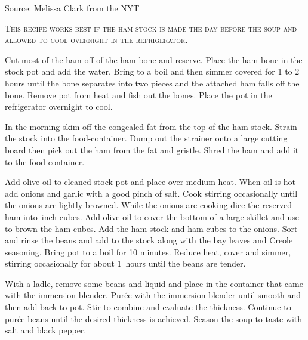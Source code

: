 \documentclass[letterpaper]{recipePMG}
\newcommand{\quarter}{\nicefrac{1}{4} \,}
\newcommand{\half}{\nicefrac{1}{2} \,}
\begin{document}
Source: Melissa Clark from the NYT


\newpage
{}
\label{ButterBeanAndHamSoup}



\textsc{This recipe works best if the ham stock is made the day before the soup and allowed to cool overnight in the refrigerator.}

Cut most of the ham off of the ham bone and reserve.  Place the ham bone in the stock pot and add the water.  Bring to a boil and then simmer covered for 1 to 2 hours until the bone separates into two pieces and the attached ham falls off the bone. Remove pot from heat and fish out the bones.  Place the pot in the refrigerator overnight to cool.

In the morning skim off the congealed fat from the top of the ham stock. Strain the stock into  the food-container. Dump out the strainer onto a large cutting board then pick out the ham from the fat and gristle. Shred the ham and add it to the food-container.  

Add olive oil to cleaned stock pot and place over medium heat.  When oil is hot add onions and garlic with a good pinch of salt. Cook stirring occasionally until the onions are lightly browned. While the onions are cooking dice the reserved ham into \quarter inch cubes.  Add olive oil to cover the bottom of a large skillet and use to brown the ham cubes. Add the ham stock and ham cubes to the onions. Sort and rinse the beans and add to the stock along with the bay leaves and Creole seasoning. Bring pot to a boil for 10 minutes. Reduce heat, cover and simmer, stirring occasionally for about 1\half hours until the beans are tender. 

With a ladle, remove some beans and liquid and place in the container that came with the immersion blender.  Pur\'{e}e with the immersion blender until smooth and then add back to pot. Stir to combine and evaluate the thickness.  Continue to pur\'{e}e beans until the desired thickness is achieved. Season the soup to taste with salt and black pepper.
\end{document}
